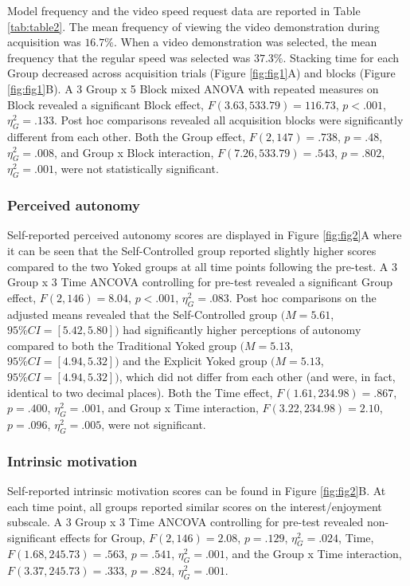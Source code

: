 \documentclass[
  english,
  man,floatsintext]{apa7}
\begin{document}
Model frequency and the video speed request data are reported in Table \ref{tab:table2}. The mean frequency of viewing the video demonstration during acquisition was \(16.7\%\). When a video demonstration was selected, the mean frequency that the regular speed was selected was \(37.3\%\). Stacking time for each Group decreased across acquisition trials (Figure \ref{fig:fig1}A) and blocks (Figure \ref{fig:fig1}B). A 3 Group x 5 Block mixed ANOVA with repeated measures on Block revealed a significant Block effect, \(F(3.63,533.79) = 116.73\), \(p < .001\), \(\eta^2_{G} = .133\). Post hoc comparisons revealed all acquisition blocks were significantly different from each other. Both the Group effect, \(F(2,147) = .738\), \(p = .48\), \(\eta^2_{G} = .008\), and Group x Block interaction, \(F(7.26,533.79) = .543\), \(p = .802\), \(\eta^2_{G} = .001\), were not statistically significant.

\hypertarget{perceived-autonomy}{%
\subsubsection{Perceived autonomy}\label{perceived-autonomy}}

Self-reported perceived autonomy scores are displayed in Figure \ref{fig:fig2}A where it can be seen that the Self-Controlled group reported slightly higher scores compared to the two Yoked groups at all time points following the pre-test. A 3 Group x 3 Time ANCOVA controlling for pre-test revealed a significant Group effect, \(F(2,146) = 8.04\), \(p < .001\), \(\eta^2_{G} = .083.\) Post hoc comparisons on the adjusted means revealed that the Self-Controlled group \((M = 5.61\), \(95\%CI =[5.42,5.80])\) had significantly higher perceptions of autonomy compared to both the Traditional Yoked group \((M = 5.13\), \(95\%CI = [4.94,5.32])\) and the Explicit Yoked group \((M = 5.13\), \(95\%CI = [4.94,5.32])\), which did not differ from each other (and were, in fact, identical to two decimal places). Both the Time effect, \(F(1.61,234.98) = .867\), \(p = .400\), \(\eta^2_{G} = .001\), and Group x Time interaction, \(F(3.22,234.98) = 2.10\), \(p = .096\), \(\eta^2_{G} = .005\), were not significant.

\hypertarget{intrinsic-motivation}{%
\subsubsection{Intrinsic motivation}\label{intrinsic-motivation}}

Self-reported intrinsic motivation scores can be found in Figure \ref{fig:fig2}B. At each time point, all groups reported similar scores on the interest/enjoyment subscale. A 3 Group x 3 Time ANCOVA controlling for pre-test revealed non-significant effects for Group, \(F(2,146) = 2.08\), \(p = .129\), \(\eta^2_{G} = .024\), Time, \(F(1.68,245.73) = .563\), \(p = .541\), \(\eta^2_{G} = .001\), and the Group x Time interaction, \(F(3.37,245.73) = .333\), \(p = .824\), \(\eta^2_{G} = .001\).
\end{document}

